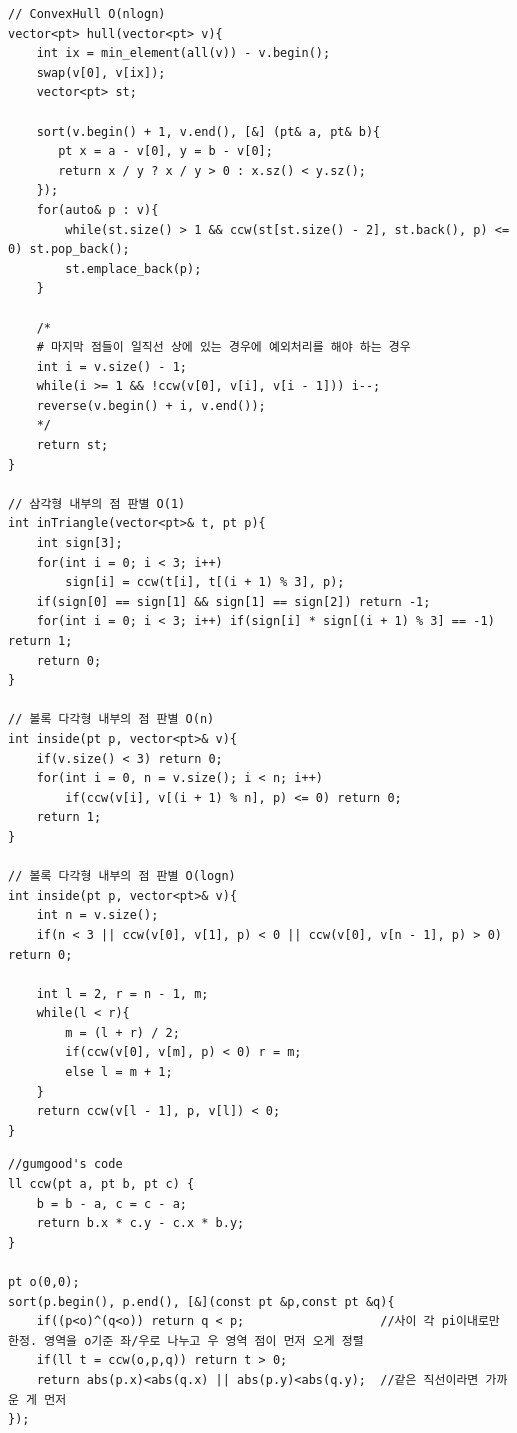 \documentclass[landscape, 8pt, a4paper, oneside, twocolumn]{extarticle}
\begin{document}
\begin{verbatim}
// ConvexHull O(nlogn)
vector<pt> hull(vector<pt> v){
    int ix = min_element(all(v)) - v.begin();
    swap(v[0], v[ix]);
    vector<pt> st;
    
    sort(v.begin() + 1, v.end(), [&] (pt& a, pt& b){
       pt x = a - v[0], y = b - v[0];
       return x / y ? x / y > 0 : x.sz() < y.sz();
    });
    for(auto& p : v){
        while(st.size() > 1 && ccw(st[st.size() - 2], st.back(), p) <= 0) st.pop_back();
        st.emplace_back(p);
    }
    
    /*
    # 마지막 점들이 일직선 상에 있는 경우에 예외처리를 해야 하는 경우
    int i = v.size() - 1;
    while(i >= 1 && !ccw(v[0], v[i], v[i - 1])) i--;
    reverse(v.begin() + i, v.end());
    */
    return st;
}

// 삼각형 내부의 점 판별 O(1)
int inTriangle(vector<pt>& t, pt p){
    int sign[3];
    for(int i = 0; i < 3; i++)
        sign[i] = ccw(t[i], t[(i + 1) % 3], p);
    if(sign[0] == sign[1] && sign[1] == sign[2]) return -1;
    for(int i = 0; i < 3; i++) if(sign[i] * sign[(i + 1) % 3] == -1) return 1;
    return 0;
}

// 볼록 다각형 내부의 점 판별 O(n)
int inside(pt p, vector<pt>& v){
    if(v.size() < 3) return 0;
    for(int i = 0, n = v.size(); i < n; i++)
        if(ccw(v[i], v[(i + 1) % n], p) <= 0) return 0;
    return 1;
}

// 볼록 다각형 내부의 점 판별 O(logn)
int inside(pt p, vector<pt>& v){
    int n = v.size();
    if(n < 3 || ccw(v[0], v[1], p) < 0 || ccw(v[0], v[n - 1], p) > 0) return 0;
    
    int l = 2, r = n - 1, m;
    while(l < r){
        m = (l + r) / 2;
        if(ccw(v[0], v[m], p) < 0) r = m;
        else l = m + 1;
    }
    return ccw(v[l - 1], p, v[l]) < 0;
}
\end{verbatim}
\begin{verbatim}
//gumgood's code
ll ccw(pt a, pt b, pt c) {
    b = b - a, c = c - a;
    return b.x * c.y - c.x * b.y;
}

pt o(0,0);
sort(p.begin(), p.end(), [&](const pt &p,const pt &q){
    if((p<o)^(q<o)) return q < p;                   //사이 각 pi이내로만 한정. 영역을 o기준 좌/우로 나누고 우 영역 점이 먼저 오게 정렬
    if(ll t = ccw(o,p,q)) return t > 0;          
    return abs(p.x)<abs(q.x) || abs(p.y)<abs(q.y);  //같은 직선이라면 가까운 게 먼저
});
\end{verbatim}
\end{document}
